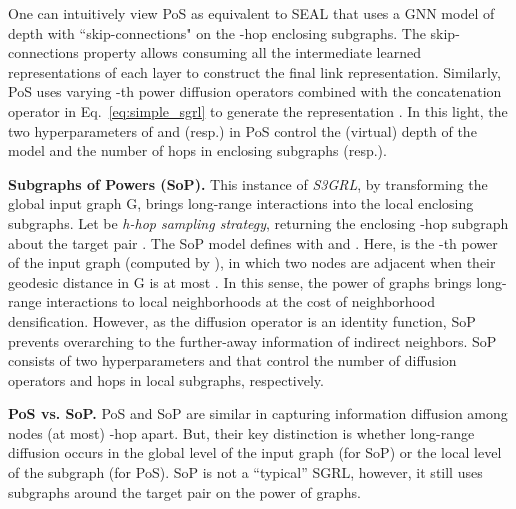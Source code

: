 \documentclass[sigconf, nonacm]{acmart}
\newcommand{\pos}{{P\lowercase{o}S}\xspace}
\newcommand{\sop}{{S\lowercase{o}P}\xspace}
\newcommand{\ssgrl}{\textit{S3GRL}\xspace}
\begin{document}
One can intuitively view \pos as equivalent to SEAL that uses a GNN model of depth  with ``skip-connections" \cite{xu2018representation} on the -hop enclosing subgraphs. The skip-connections property allows consuming all the intermediate learned representations of each layer to construct the final link representation. Similarly, \pos uses varying -th power diffusion operators combined with the concatenation operator in Eq.~\ref{eq:simple_sgrl} to generate the representation . In this light, the two hyperparameters of  and  (resp.) in \pos control the (virtual) depth of the model and the number of hops in enclosing subgraphs (resp.).  





\label{sec:pos}


\vskip 1mm
\noindent \textbf{Subgraphs of Powers (\sop).} This instance of \ssgrl, by transforming the global input graph G, brings long-range interactions into the local enclosing subgraphs. Let  be \textit{h-hop sampling strategy}, returning the enclosing -hop subgraph about the target pair . The \sop model defines  with  and . Here,  is the -th power of the input graph (computed by ), in which two nodes are adjacent when their geodesic distance in G is at most . In this sense, the power of graphs brings long-range interactions to local neighborhoods at the cost of neighborhood densification. However, as the diffusion operator is an identity function, \sop prevents overarching to the further-away information of indirect neighbors. \sop consists of two hyperparameters  and  that control the number of diffusion operators and hops in local subgraphs, respectively.  

\vskip 1mm
\noindent \textbf{\pos vs. \sop.} \pos and \sop are similar in capturing information diffusion among nodes (at most) -hop apart. But, their key distinction is whether long-range diffusion occurs in the global level of the input graph (for \sop) or the local level of the subgraph (for \pos). \sop is not a ``typical'' SGRL, however, it still uses subgraphs around the target pair on the power of graphs.
\end{document}
